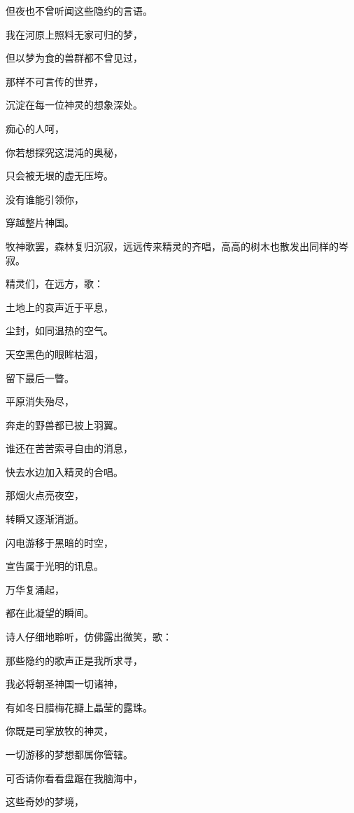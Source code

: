 \documentclass[UTF8]{article}
\begin{document}
\par 但夜也不曾听闻这些隐约的言语。
\par 我在河原上照料无家可归的梦，
\par 但以梦为食的兽群都不曾见过，
\par 那样不可言传的世界，
\par 沉淀在每一位神灵的想象深处。
\par 痴心的人呵，
\par 你若想探究这混沌的奥秘，
\par 只会被无垠的虚无压垮。
\par 没有谁能引领你，
\par 穿越整片神国。
\\[0.6cm]
\par 牧神歌罢，森林复归沉寂，远远传来精灵的齐唱，高高的树木也散发出同样的岑寂。
\\[0.6cm]
\par 精灵们，在远方，歌：
\\[0.6cm]
\par 土地上的哀声近于平息，
\par 尘封，如同温热的空气。
\par 天空黑色的眼眸枯涸，
\par 留下最后一瞥。
\par 平原消失殆尽，
\par 奔走的野兽都已披上羽翼。
\par 谁还在苦苦索寻自由的消息，
\par 快去水边加入精灵的合唱。
\par 那烟火点亮夜空，
\par 转瞬又逐渐消逝。
\par 闪电游移于黑暗的时空，
\par 宣告属于光明的讯息。
\par 万华复涌起，
\par 都在此凝望的瞬间。
\\[0.6cm]
\par 诗人仔细地聆听，仿佛露出微笑，歌：
\\[0.6cm]
\par 那些隐约的歌声正是我所求寻，
\par 我必将朝圣神国一切诸神，
\par 有如冬日腊梅花瓣上晶莹的露珠。
\par 你既是司掌放牧的神灵，
\par 一切游移的梦想都属你管辖。
\par 可否请你看看盘踞在我脑海中，
\par 这些奇妙的梦境，
\end{document}
